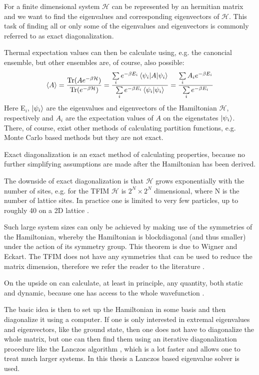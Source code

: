\documentclass[a4paper,12pt]{article}
\begin{document}
For a finite dimensional system $\mathcal{H}$ can be represented by an
hermitian matrix and we want to find the eigenvalues and corresponding eigenvectors of $\mathcal{H}$.
This task of finding all or only some of the eigenvalues and
eigenvectors is commonly referred to as exact diagonalization.

Thermal expectation values can then be calculate using, e.g. the
canoncial ensemble, but other ensembles are, of course, also possible:
\begin{equation}
\label{eq:2}
\braket{A} = \frac{ \text{Tr}(Ae^{-\beta \mathcal H})}{ \text{Tr}(e^{-\beta \mathcal
    H})} = \frac{\sum\limits_i e^{-\beta
      E_{i}} \braket{\psi_i|A|\psi_{i}}}{\sum\limits_i e^{-\beta
      E_i} \braket{\psi_i|\psi_{i}}} = \frac{\sum\limits_i A_i e^{-\beta
      E_{i}}}{\sum\limits_i e^{-\beta
      E_i}}
\end{equation}
Here E$_{i}$, $\ket{\psi_i}$ are the eigenvalues and  eigenvectors of
the Hamiltonian $\mathcal{H}$, respectively and $A_i$ are the
expectation values of $A$ on the eigenstates $\ket{\psi_i}$. There, of
course, exist other methods of calculating partition functions,
e.g. Monte Carlo based methods but they are not exact.

Exact diagonalization is an exact method of calculating properties,
because no further simplifying assumptions are made after the
Hamiltonian has been derived.

The downside of exact diagonalization is that $\mathcal{H}$ grows
exponentially with the number of sites, e.g. for the TFIM
$\mathcal{H}$ is $2^N \times 2^N$ dimensional, where N is the number
of lattice sites. In practice one is limited to very
few particles, up to roughly 40 on a 2D lattice \cite{Noack}.

Such large system sizes can only be achieved by making use of the
symmetries of the Hamiltonian, whereby the Hamiltonian is blockdiagonal
(and thus smaller)
under the action of its symmetry group. This theorem is due to Wigner
and Eckart. The TFIM does not
have any symmetries that can be used to reduce the matrix dimension,
therefore we refer the reader to the literature
\cite{Laflorencie,Noack,Fehske}.

On the upside on can calculate, at least in principle, any quantity,
both static and dynamic, because one has access to the whole
wavefunction \cite{Noack}.

The basic idea is then to set up the Hamiltonian in some basis and
then diagonalize it using a computer. If one is only interested in
extremal eigenvalues and eigenvectors, like the ground state, then one
does not have to diagonalize the whole matrix, but one can then find
them using an iterative diagonalization procedure like the Lanczos
algorithm \cite{Lanczos}, which is a lot faster and allows one to treat much larger
systems. In this thesis a Lanczos based eigenvalue solver is used.\\
\end{document}
